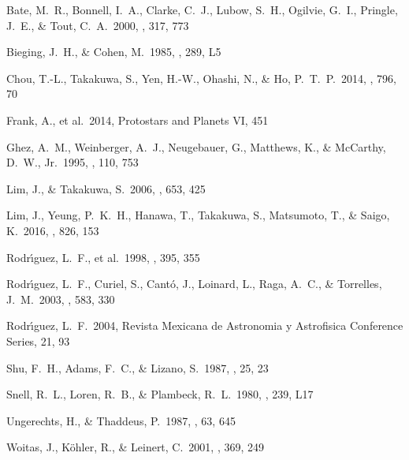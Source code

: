 \documentclass[debug]{rmaa}
\begin{document}
\begin{thebibliography}{}

 Bate, M.~R., Bonnell, I.~A., Clarke, 
C.~J., Lubow, S.~H., Ogilvie, G.~I., Pringle, J.~E., 
\& Tout, C.~A.\ 2000, \mnras, 317, 773 

 Bieging, J.~H., \& Cohen, 
M.\ 1985, \apjl, 289, L5 

 Chou, T.-L., Takakuwa, S., Yen, H.-W., 
Ohashi, N., \& Ho, P.~T.~P.\ 2014, \apj, 796, 70 

 Frank, A., et al.\ 2014, Protostars 
and Planets VI, 451 

 Ghez, A.~M., Weinberger, A.~J., 
Neugebauer, G., Matthews, K., \& McCarthy, D.~W., Jr.\ 1995, \aj, 110, 753 

 Lim, J., \& Takakuwa, S.\ 2006, \apj, 653, 425 

 Lim, J., Yeung, P.~K.~H., Hanawa, T., 
Takakuwa, S., Matsumoto, T., \& Saigo, K.\ 2016, \apj, 826, 153 

 Rodr{\'{\i}}guez, 
L.~F., et al.\ 1998, \nat, 395, 355 

 Rodr{\'{\i}}guez, 
L.~F., Curiel, S., Cant{\'o}, J., Loinard, L., Raga, A.~C., 
\& Torrelles, J.~M.\ 2003, \apj, 583, 330 

 Rodr{\'{\i}}guez, L.~F.\ 
2004, Revista Mexicana de Astronomia y Astrofisica Conference Series, 21, 
93 

 Shu, F.~H., Adams, F.~C., 
\& Lizano, S.\ 1987, \araa, 25, 23 

 Snell, R.~L., Loren, R.~B., 
\& Plambeck, R.~L.\ 1980, \apjl, 239, L17 

 Ungerechts, H., \& Thaddeus, P.\ 1987, \apjs, 63, 645 

 Woitas, J., K{\"o}hler, R., 
\& Leinert, C.\ 2001, \aap, 369, 249 

\end{thebibliography}
\end{document}
